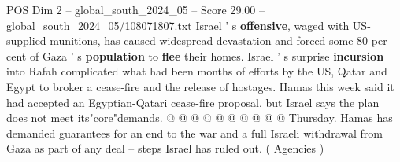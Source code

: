 \begin{textsample}{POS Dim 2 – global\_south\_2024\_05 – Score 29.00 – global\_south\_2024\_05/108071807.txt}
Israel ' s \textbf{offensive}, waged with US-supplied munitions, has caused widespread devastation and forced some 80 per cent of Gaza ' s \textbf{population} to \textbf{flee} their homes.
Israel ' s surprise \textbf{incursion} into Rafah complicated what had been months of efforts by the US, Qatar and Egypt to broker a cease-fire and the release of hostages.
Hamas this week said it had accepted an Egyptian-Qatari cease-fire proposal, but Israel says the plan does not meet its"core"demands. @ @ @ @ @ @ @ @ @ @ Thursday.
Hamas has demanded guarantees for an end to the war and a full Israeli withdrawal from Gaza as part of any deal -- steps Israel has ruled out. ( Agencies )

\end{textsample}
